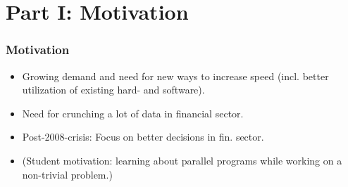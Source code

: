 \section{Part I: Motivation}

\begin{frame}
  \frametitle{Motivation}
  \begin{itemize}
    \item Growing demand and need for new ways to increase
      speed (incl. better utilization of existing hard- and
      software).
    \item Need for crunching a lot of data in financial sector.
    \item Post-2008-crisis: Focus on better decisions in
      fin. sector.
    \item (Student motivation: learning about parallel
      programs while working on a non-trivial problem.)
  \end{itemize}
\end{frame}
